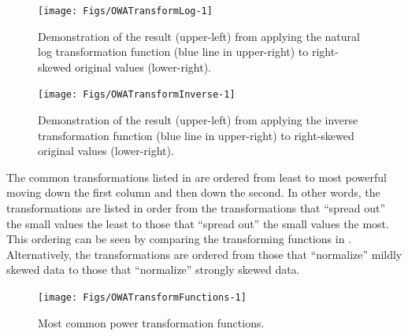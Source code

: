 \documentclass[10pt,openany]{book}\usepackage[]{graphicx}\usepackage[]{color}
\newenvironment{knitrout}{}{} %
\begin{document}
\begin{knitrout}
\color{fgcolor}\begin{figure}[!h]

{\centering \texttt{[image: Figs/OWATransformLog-1]} 

}

\caption[Demonstration of the result (upper-left) from applying the natural log transformation function (blue line in upper-right) to right-skewed original values (lower-right)]{Demonstration of the result (upper-left) from applying the natural log transformation function (blue line in upper-right) to right-skewed original values (lower-right).}\label{fig:OWATransformLog}
\end{figure}


\end{knitrout}

\begin{knitrout}
\color{fgcolor}\begin{figure}[!h]

{\centering \texttt{[image: Figs/OWATransformInverse-1]} 

}

\caption[Demonstration of the result (upper-left) from applying the inverse transformation function (blue line in upper-right) to right-skewed original values (lower-right)]{Demonstration of the result (upper-left) from applying the inverse transformation function (blue line in upper-right) to right-skewed original values (lower-right).}\label{fig:OWATransformInverse}
\end{figure}


\end{knitrout}

The common transformations listed in  are ordered from least to most powerful moving down the first column and then down the second.  In other words, the transformations are listed in order from the transformations that ``spread out'' the small values the least to those that ``spread out'' the small values the most.  This ordering can be seen by comparing the transforming functions in .  Alternatively, the transformations are ordered from those that ``normalize'' mildly skewed data to those that ``normalize'' strongly skewed data.

\begin{knitrout}
\color{fgcolor}\begin{figure}[hbtp]

{\centering \texttt{[image: Figs/OWATransformFunctions-1]} 

}

\caption[Most common power transformation functions]{Most common power transformation functions.}\label{fig:OWATransformFunctions}
\end{figure}


\end{knitrout}
\end{document}
